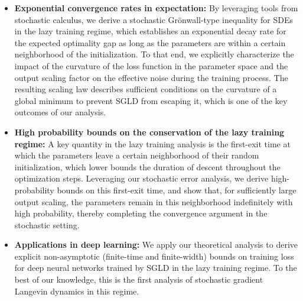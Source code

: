 \documentclass[10pt]{article} %
\begin{document}
\begin{itemize}
    \item \textbf{Exponential convergence rates in expectation:} By leveraging tools from stochastic calculus, we derive a stochastic Grönwall-type inequality for SDEs in the lazy training regime, which establishes an exponential decay rate for the expected optimality gap as long as the parameters are within a certain neighborhood of the initialization. To that end, we explicitly characterize the impact of the curvature of the loss function in the parameter space and the output scaling factor on the effective noise during the training process. The resulting scaling law describes sufficient conditions on the curvature of a global minimum to prevent SGLD from escaping it, which is one of the key outcomes of our analysis.
    
    \item \textbf{High probability bounds on the conservation of the lazy training regime:} A key quantity in the lazy training analysis is the first-exit time at which the parameters leave a certain neighborhood of their random initialization, which lower bounds the duration of descent throughout the optimization steps. 
    Leveraging our stochastic error analysis, we derive high-probability bounds on this first-exit time, and show that, for sufficiently large output scaling, the parameters remain in this neighborhood indefinitely with high probability, thereby completing the convergence argument in the stochastic setting.

    \item \textbf{Applications in deep learning:} We apply our theoretical analysis to derive explicit non-asymptotic (finite-time and finite-width) bounds on training loss for deep neural networks trained by SGLD in the lazy training regime. To the best of our knowledge, this is the first analysis of stochastic gradient Langevin dynamics in this regime.

    
\end{itemize}
\end{document}
